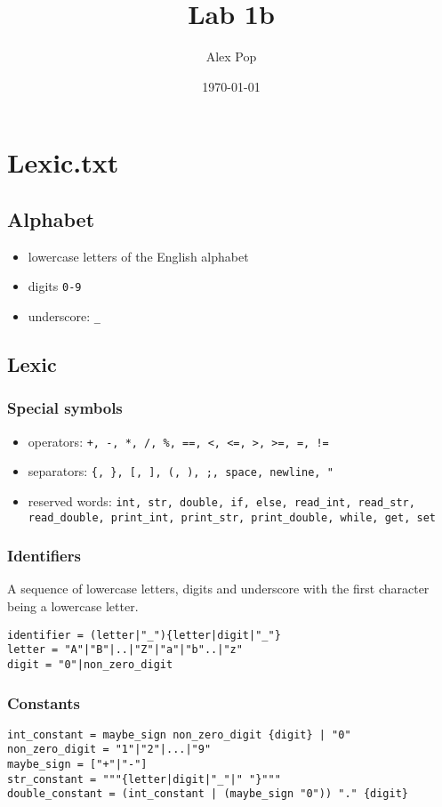 \documentclass[11pt]{article}
\author{Alex Pop}
\date{\today}
\title{Lab 1b}
\begin{document}
\maketitle
\tableofcontents

\section{Lexic.txt}
\label{sec:orgae105f5}
\subsection{Alphabet}
\label{sec:org0bb0912}
\begin{itemize}
\item lowercase letters of the English alphabet
\item digits \texttt{0-9}
\item underscore: \texttt{\_}
\end{itemize}

\subsection{Lexic}
\label{sec:orge32e269}
\subsubsection{Special symbols}
\label{sec:org63a2ff6}
\begin{itemize}
\item operators: \texttt{+, -, *, /, \%, ==, <, <=, >, >=, =, !=}
\item separators: \texttt{\{, \}, [, ], (, ), ;, space, newline, "}
\item reserved words: \texttt{int, str, double, if, else, read\_int, read\_str, read\_double, print\_int, print\_str, print\_double, while, get, set}
\end{itemize}

\subsubsection{Identifiers}
\label{sec:org16069a2}
A sequence of lowercase letters, digits and underscore with the first character being a lowercase letter.
\begin{verbatim}
identifier = (letter|"_"){letter|digit|"_"}
letter = "A"|"B"|..|"Z"|"a"|"b"..|"z"
digit = "0"|non_zero_digit
\end{verbatim}

\subsubsection{Constants}
\label{sec:orgff4fa14}
\begin{verbatim}
int_constant = maybe_sign non_zero_digit {digit} | "0"
non_zero_digit = "1"|"2"|...|"9"
maybe_sign = ["+"|"-"]
str_constant = """{letter|digit|"_"|" "}"""
double_constant = (int_constant | (maybe_sign "0")) "." {digit}
\end{verbatim}
\end{document}
